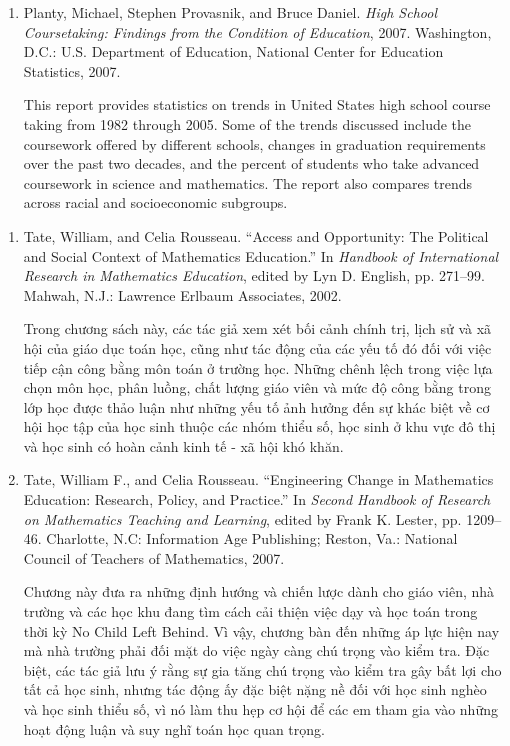 \documentclass[
  10pt,
  a4paper,
  landscape,
  twoside,
  openany
]{scrbook}
\newcommand{\VI}[1]{#1}
\begin{document}
{{\begin{enumerate}
    \item Planty, Michael, Stephen Provasnik, and Bruce Daniel. \emph{High School Coursetaking: Findings from the Condition of Education}, 2007. Washington, D.C.: U.S. Department of Education, National Center for Education Statistics, 2007.

      This report provides statistics on trends in United States high school course taking from 1982 through 2005. Some of the trends discussed include the coursework offered by different schools, changes in graduation requirements over the past two decades, and the percent of students who take advanced coursework in science and mathematics. The report also compares trends across racial and socioeconomic subgroups.
  \end{enumerate}}
}
{
\VI{
  \begin{enumerate}
    \item Tate, William, and Celia Rousseau. ``Access and Opportunity: The Political and Social Context of Mathematics Education.'' In \emph{Handbook of International Research in Mathematics Education}, edited by Lyn D. English, pp. 271--99. Mahwah, N.J.: Lawrence Erlbaum Associates, 2002.

      Trong chương sách này, các tác giả xem xét bối cảnh chính trị, lịch sử và xã hội của giáo dục toán học, cũng như tác động của các yếu tố đó đối với việc tiếp cận công bằng môn toán ở trường học. Những chênh lệch trong việc lựa chọn môn học, phân luồng, chất lượng giáo viên và mức độ công bằng trong lớp học được thảo luận như những yếu tố ảnh hưởng đến sự khác biệt về cơ hội học tập của học sinh thuộc các nhóm thiểu số, học sinh ở khu vực đô thị và học sinh có hoàn cảnh kinh tế - xã hội khó khăn.

    \item Tate, William F., and Celia Rousseau. ``Engineering Change in Mathematics Education: Research, Policy, and Practice.'' In \emph{Second Handbook of Research on Mathematics Teaching and Learning}, edited by Frank K. Lester, pp. 1209--46. Charlotte, N.C: Information Age Publishing; Reston, Va.: National Council of Teachers of Mathematics, 2007.

      Chương này đưa ra những định hướng và chiến lược dành cho giáo viên, nhà trường và các học khu đang tìm cách cải thiện việc dạy và học toán trong thời kỳ No Child Left Behind. Vì vậy, chương bàn đến những áp lực hiện nay mà nhà trường phải đối mặt do việc ngày càng chú trọng vào kiểm tra. Đặc biệt, các tác giả lưu ý rằng sự gia tăng chú trọng vào kiểm tra gây bất lợi cho tất cả học sinh, nhưng tác động ấy đặc biệt nặng nề đối với học sinh nghèo và học sinh thiểu số, vì nó làm thu hẹp cơ hội để các em tham gia vào những hoạt động luận và suy nghĩ toán học quan trọng.


\end{enumerate}}}
\end{document}
